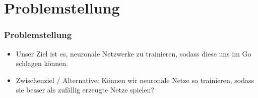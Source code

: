 \section{Problemstellung}

\begin{frame}
    \frametitle{Problemstellung}
    \begin{itemize}
        \item
            Unser Ziel ist es, neuronale Netzwerke zu trainieren, sodass diese
            uns im Go schlagen können.

        \item Zwischenziel / Alternative:
            Können wir neuronale Netze so trainieren, sodass sie besser als
            zufällig erzeugte Netze spielen?
    \end{itemize}

    \hfill \\
    \hfill \\
\end{frame}


